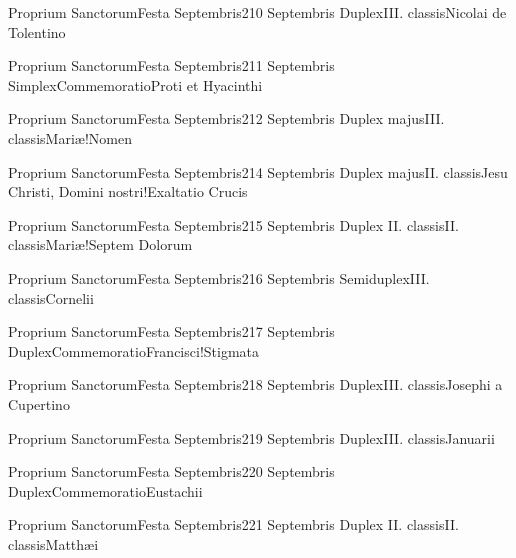 \documentclass[invitatoriale-romanum.tex]{subfiles}
\begin{document}
	{Proprium Sanctorum}{Festa Septembris}{2}{10 Septembris}
	{Duplex}{III. classis}{Nicolai de Tolentino}
	{}
	{}

	{Proprium Sanctorum}{Festa Septembris}{2}{11 Septembris}
	{Simplex}{Commemoratio}{Proti et Hyacinthi}
	{}
	{\invitferia}

	{Proprium Sanctorum}{Festa Septembris}{2}{12 Septembris}
	{Duplex majus}{III. classis}{Mariæ!Nomen}
	{}
	{}

	{Proprium Sanctorum}{Festa Septembris}{2}{14 Septembris}
	{Duplex majus}{II. classis}{Jesu Christi, Domini nostri!Exaltatio Crucis}
	{}
	{}

	{Proprium Sanctorum}{Festa Septembris}{2}{15 Septembris}
	{Duplex II. classis}{II. classis}{Mariæ!Septem Dolorum}
	{}
	{}

	{Proprium Sanctorum}{Festa Septembris}{2}{16 Septembris}
	{Semiduplex}{III. classis}{Cornelii}
	{}
	{}

	{Proprium Sanctorum}{Festa Septembris}{2}{17 Septembris}
	{Duplex}{Commemoratio}{Francisci!Stigmata}
	{}
	{\invitferia}

	{Proprium Sanctorum}{Festa Septembris}{2}{18 Septembris}
	{Duplex}{III. classis}{Josephi a Cupertino}
	{}
	{}

	{Proprium Sanctorum}{Festa Septembris}{2}{19 Septembris}
	{Duplex}{III. classis}{Januarii}
	{}
	{}

	{Proprium Sanctorum}{Festa Septembris}{2}{20 Septembris}
	{Duplex}{Commemoratio}{Eustachii}
	{}
	{\invitferia}

	{Proprium Sanctorum}{Festa Septembris}{2}{21 Septembris}
	{Duplex II. classis}{II. classis}{Matthæi}
	{}
	{}
\end{document}
